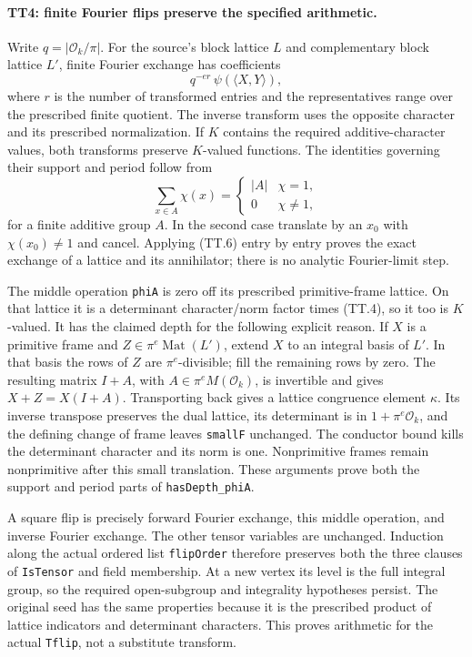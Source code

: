 \paragraph{TT4: finite Fourier flips preserve the specified arithmetic.}
Write $q=|\mathcal O_k/\pi|$. For the source's block lattice $L$
and complementary block lattice $L'$, finite Fourier exchange has
coefficients
\[
 q^{-e r}\,\psi(\langle X,Y\rangle),                       \tag{TT.5}
\]
where $r$ is the number of transformed entries and the representatives
range over the prescribed finite quotient. The inverse transform uses
the opposite character and its prescribed normalization. If $K$
contains the required additive-character values, both transforms
preserve $K$-valued functions. The identities governing their support
and period follow from
\[
 \sum_{x\in A}\chi(x)=
 \begin{cases}|A|&\chi=1,\\0&\chi\ne1,\end{cases}          \tag{TT.6}
\]
for a finite additive group $A$. In the second case translate by an
$x_0$ with $\chi(x_0)\ne1$ and cancel. Applying (TT.6) entry by
entry proves the exact exchange of a lattice and its annihilator;
there is no analytic Fourier-limit step.

The middle operation \texttt{phiA} is zero off its prescribed
primitive-frame lattice. On that lattice it is a determinant
character/norm factor times (TT.4), so it too is $K$-valued. It has
the claimed depth for the following explicit reason. If $X$ is a
primitive frame and $Z\in\pi^e\operatorname{Mat}(L')$, extend
$X$ to an integral basis of $L'$. In that basis the rows of $Z$ are
$\pi^e$-divisible; fill the remaining rows by zero. The resulting
matrix $I+A$, with $A\in\pi^eM(\mathcal O_k)$, is invertible
and gives $X+Z=X(I+A)$. Transporting back gives a lattice
congruence element $\kappa$. Its inverse transpose preserves the
dual lattice, its determinant is in $1+\pi^e\mathcal O_k$, and
the defining change of frame leaves \texttt{smallF} unchanged.
The conductor bound kills the determinant character and its norm
is one. Nonprimitive frames remain nonprimitive after this small
translation. These arguments prove both the support and period
parts of \texttt{hasDepth\_phiA}.

A square flip is precisely forward Fourier exchange, this middle
operation, and inverse Fourier exchange. The other tensor variables
are unchanged. Induction along the actual ordered list
\texttt{flipOrder} therefore preserves both the three clauses of
\texttt{IsTensor} and field membership. At a new vertex its level
is the full integral group, so the required open-subgroup and
integrality hypotheses persist. The original seed has the same
properties because it is the prescribed product of lattice
indicators and determinant characters. This proves arithmetic for
the actual \texttt{Tflip}, not a substitute transform.

